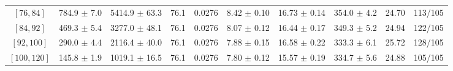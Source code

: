 \begin{tabular}{c||c|c|c|c|c|c|c||c|c}
$[76, 84]$ & 784.9 $\pm$ 7.0 & 5414.9 $\pm$ 63.3 & 76.1 & 0.0276 & 8.42 $\pm$ 0.10 & 16.73 $\pm$ 0.14 & 354.0 $\pm$ 4.2 & 24.70 & 113/105\\
$[84, 92]$ & 469.3 $\pm$ 5.4 & 3277.0 $\pm$ 48.1 & 76.1 & 0.0276 & 8.07 $\pm$ 0.12 & 16.44 $\pm$ 0.17 & 349.3 $\pm$ 5.2 & 24.94 & 122/105\\
$[92, 100]$ & 290.0 $\pm$ 4.4 & 2116.4 $\pm$ 40.0 & 76.1 & 0.0276 & 7.88 $\pm$ 0.15 & 16.58 $\pm$ 0.22 & 333.3 $\pm$ 6.1 & 25.72 & 128/105\\
$[100, 120]$ & 145.8 $\pm$ 1.9 & 1019.1 $\pm$ 16.5 & 76.1 & 0.0276 & 7.80 $\pm$ 0.12 & 15.57 $\pm$ 0.19 & 334.7 $\pm$ 5.6 & 24.88 & 105/105\\
\end{tabular}
